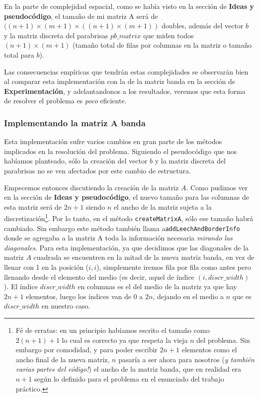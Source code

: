 En la parte de complejidad espacial, como se había visto en la sección de \textbf{Ideas y pseudocódigo}, el tamaño de mi matriz A será de $((n+1) \times (m+1) \times ((n+1) \times (m+1))$ doubles, además del vector $b$ y la matriz discreta del parabrisas $pb\_matrix$ que miden todos $(n+1) \times (m+1)$ (tamaño total de filas por columnas en la matriz o tamaño total para $b$).

Las consecuencias empíricas que tendrán estas complejidades se observarán bien al comparar esta implementación con la de la matriz banda en la sección de \textbf{Experimentación}, y adelantandonos a los resultados, veremos que esta forma de resolver el problema es \textit{poco} eficiente.

\subsubsection{Implementando la matriz A banda}

Esta implementación sufre varios cambios en gran parte de los métodos implicados en la resolución del problema. Siguiendo el pseudocódigo que nos habíamos planteado, sólo la creación del vector $b$ y la matriz discreta del parabrisas no se ven afectados por este cambio de estructura.

\vspace{\baselineskip}
Empecemos entonces discutiendo la creación de la matriz $A$. Como pudimos ver en la sección de \textbf{Ideas y pseudocódigo}, el nuevo tamaño para las columnas de esta matriz será de $2n+1$ siendo $n$ el ancho de la matriz sujeta a la discretización\footnote{Fé de erratas: en un principio habíamos escrito el tamaño como $2(n+1)+1$ lo cual es correcto ya que respeta la vieja $n$ del problema. Sin embargo por comodidad, y para poder escribir $2n+1$ elementos como el ancho final de la nueva matriz, $n$ pasaría a ser ahora para nosotros (\textit{y también varias partes del código!}) el ancho de la matriz banda, que en realidad era $n+1$ según lo definido para el problema en el enunciado del trabajo práctico.}. Por lo tanto, en el método \texttt{createMatrixA}, sólo ese tamaño habrá cambiado. Sin embargo este método también llama a\texttt{addLeechAndBorderInfo} donde se agregaba a la matriz A toda la información necesaria \textit{mirando las diagonales}. Para esta implementación, ya que decidimos que las diagonales de la matriz $A$ cuadrada se encuentren en la mitad de la nueva matriz banda, en vez de llenar con 1 en la posición ($i,i$), simplemente iremos fila por fila como antes pero llenando desde el elemento del medio (es decir, aquel de índice $(i,discr\_width)$ ). El índice $discr\_width$ en columnas es el del medio de la matriz ya que hay $2n+1$ elementos, luego los índices van de 0 a $2n$, dejando en el medio a $n$ que es $discr\_width$ en nuestro caso.

